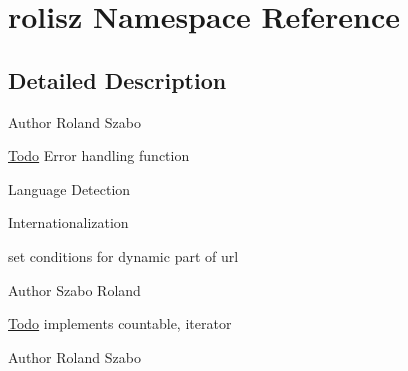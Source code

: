 \hypertarget{namespacerolisz}{
\section{rolisz Namespace Reference}
\label{namespacerolisz}
}


\subsection{Detailed Description}
\begin{DoxyAuthor}{Author}
Roland Szabo 
\end{DoxyAuthor}
\begin{Desc}
\item[\hyperlink{todo__todo000001}{Todo}]Error handling function 

Language Detection 

Internationalization 

set conditions for dynamic part of url \end{Desc}


\begin{DoxyAuthor}{Author}
Szabo Roland 
\end{DoxyAuthor}
\begin{Desc}
\item[\hyperlink{todo__todo000002}{Todo}]implements countable, iterator \end{Desc}


\begin{DoxyAuthor}{Author}
Roland Szabo 
\end{DoxyAuthor}
